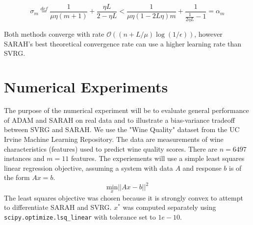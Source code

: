 \documentclass[letterpaper,11 pt]{article}
\begin{document}
\[
\sigma_{m}\stackrel{def}{=}\frac{1}{\mu\eta(m+1)}+\frac{\eta L}{2-\eta L}  <  \frac{1}{\mu\eta(1-2L\eta)m}+\frac{1}{\frac{1}{2\eta L}-1}=\alpha_{m}
\]

Both methods converge with rate $\mathcal{O}((n+L/\mu)\log(1/\epsilon))$, however SARAH's best theoretical convergence rate can use a higher learning rate than SVRG.

\section{Numerical Experiments}\label{sec:num}

The purpose of the numerical experiment will be to evaluate general performance of ADAM and SARAH on real data and to illustrate a bias-variance tradeoff between SVRG and SARAH.
We use the "Wine Quality" \cite{winequality} dataset from the UC Irvine Machine Learning Repository. The data are measurements of wine characteristics (features) used to predict wine quality scores. There are $n=6497$ instances and $m=11$ features. The experiements will use a simple least squares linear regression objective, assuming a system with data $A$ and response $b$ is of the form $Ax=b$.
\[
\underset{x}{\text{min}}||Ax-b||^{2}
\]
The least squares objective was chosen because it is strongly convex to attempt to differentiate SARAH and SVRG.  $x^*$ was computed separately using \verb|scipy.optimize.lsq_linear| with tolerance set to $1e-10$.  
\end{document}

